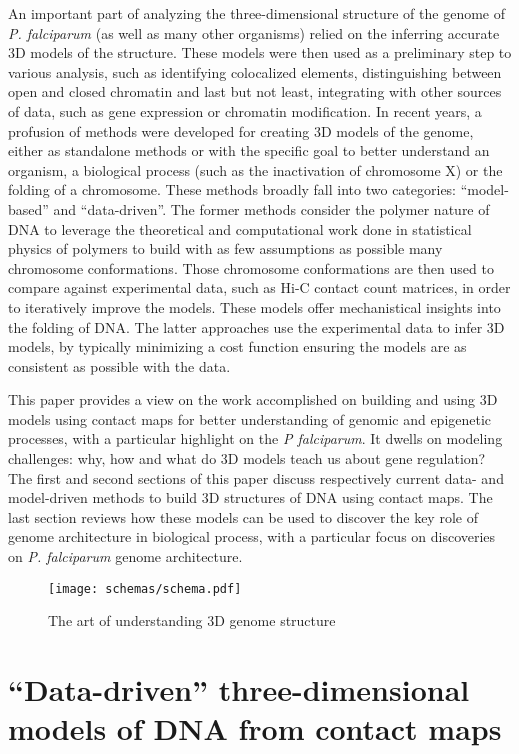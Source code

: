 \documentclass[2columns]{article}
\begin{document}
An important part of analyzing the three-dimensional structure of the genome
of {\em P. falciparum} (as well as many other organisms) relied on the
inferring accurate 3D models of the structure. These models were then used as
a preliminary step to various analysis, such as identifying colocalized
elements, distinguishing between open and closed chromatin and last but not
least, integrating with other sources of data, such as gene expression or
chromatin modification. In recent years, a profusion of methods were developed
for creating 3D models of the genome, either as standalone methods or with the
specific goal to better understand an organism, a biological process (such as
the inactivation of chromosome X) or the folding of a chromosome. These
methods broadly fall into two categories: ``model-based'' and ``data-driven''.
The former methods consider the polymer nature of DNA to leverage the
theoretical and computational work done in statistical physics of polymers to
build with as few assumptions as possible many chromosome conformations. Those
chromosome conformations are then used to compare against experimental data,
such as Hi-C contact count matrices, in order to iteratively improve the
models. These models offer mechanistical insights into the folding of DNA. The
latter approaches use the experimental data to infer 3D models, by typically
minimizing a cost function ensuring the models are as consistent as possible
with the data.

This paper provides a view on the work accomplished on building and using 3D
models using contact maps for better understanding of genomic and epigenetic
processes, with a particular highlight on the {\em P falciparum}. It dwells on
modeling challenges: why, how and what do 3D models teach us about gene
regulation? The first and second sections of this paper discuss respectively
current data- and model-driven methods to build 3D structures of DNA
using contact maps.  The last section reviews how these models can be used to
discover the key role of genome architecture in biological process, with a
particular focus on discoveries on {\em P. falciparum} genome architecture.


\begin{figure}
\centering
\texttt{[image: schemas/schema.pdf]}
\caption{The art of understanding 3D genome structure}
\label{Fig1}
\end{figure}


\section*{``Data-driven'' three-dimensional models of DNA from contact maps}
\end{document}
